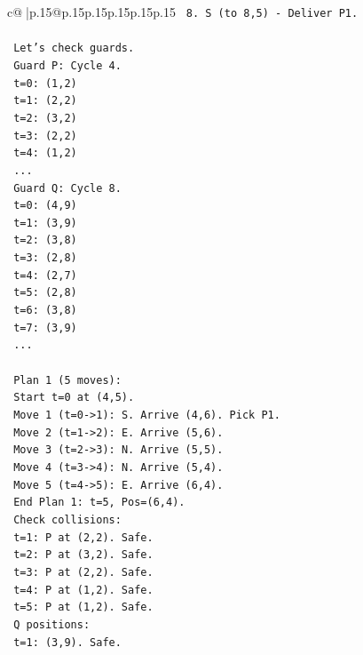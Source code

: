\documentclass{article}
\begin{document}
{\begin{supertabular}{c@{$\;$}|p{.15\linewidth}@{}p{.15\linewidth}p{.15\linewidth}p{.15\linewidth}p{.15\linewidth}p{.15\linewidth}}
{{{\texttt{   8. S (to 8,5) {-} Deliver P1.} \\
\\ 
\texttt{   Let's check guards.} \\
\texttt{   Guard P: Cycle 4.} \\
\texttt{   t=0: (1,2)} \\
\texttt{   t=1: (2,2)} \\
\texttt{   t=2: (3,2)} \\
\texttt{   t=3: (2,2)} \\
\texttt{   t=4: (1,2)} \\
\texttt{   ...} \\
\texttt{   Guard Q: Cycle 8.} \\
\texttt{   t=0: (4,9)} \\
\texttt{   t=1: (3,9)} \\
\texttt{   t=2: (3,8)} \\
\texttt{   t=3: (2,8)} \\
\texttt{   t=4: (2,7)} \\
\texttt{   t=5: (2,8)} \\
\texttt{   t=6: (3,8)} \\
\texttt{   t=7: (3,9)} \\
\texttt{   ...} \\
\\ 
\texttt{   Plan 1 (5 moves):} \\
\texttt{   Start t=0 at (4,5).} \\
\texttt{   Move 1 (t=0{-}>1): S. Arrive (4,6). Pick P1.} \\
\texttt{   Move 2 (t=1{-}>2): E. Arrive (5,6).} \\
\texttt{   Move 3 (t=2{-}>3): N. Arrive (5,5).} \\
\texttt{   Move 4 (t=3{-}>4): N. Arrive (5,4).} \\
\texttt{   Move 5 (t=4{-}>5): E. Arrive (6,4).} \\
\texttt{   End Plan 1: t=5, Pos=(6,4).} \\
\texttt{   Check collisions:} \\
\texttt{   t=1: P at (2,2). Safe.} \\
\texttt{   t=2: P at (3,2). Safe.} \\
\texttt{   t=3: P at (2,2). Safe.} \\
\texttt{   t=4: P at (1,2). Safe.} \\
\texttt{   t=5: P at (1,2). Safe.} \\
\texttt{   Q positions:} \\
\texttt{   t=1: (3,9). Safe.} \\
}}}
\end{supertabular}}
\end{document}
